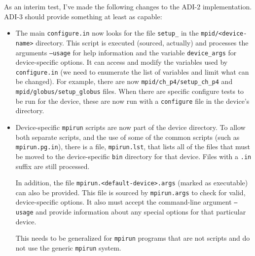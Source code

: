 \documentclass{article}
\let\file=\texttt
\let\code=\texttt
\begin{document}
As an interim test, I've made the following changes to the ADI-2
implementation.  ADI-3 should provide something at least as capable:
\begin{itemize}
\item The main \file{configure.in} now looks for the file
  \file{setup\_<device-name>} in the \file{mpid/<device-name>} directory.
  This script is executed (sourced, actually) and processes the arguments
  \texttt{--usage} for   help information and the variable
  \texttt{device\_args} for device-specific options.  It can access and modify
  the variables used by \file{configure.in} (we need to enumerate the list of
  variables and limit what can be changed).  For example, there are now
  \file{mpid/ch\_p4/setup\_ch\_p4} and \file{mpid/globus/setup\_globus} files.
  When there are specific configure tests to be run for the device, these are
  now run with a \file{configure} file in the device's directory.

\item Device-specific \file{mpirun} scripts are now part of the device
  directory.  To allow both separate scripts, and the use of some of the
  common scripts (such as \file{mpirun.pg.in}), there is a file,
  \file{mpirun.lst}, that lists all of the files that must be moved to the
  device-specific \file{bin} directory for that device.  Files with a
  \file{.in} suffix are still processed.

  In addition, the file \file{mpirun.<default-device>.args} (marked as 
  executable) can also be provided.  This file is sourced by
  \file{mpirun.args} to check for valid, device-specific options.  It also
  must accept the command-line argument \texttt{--usage} and provide 
  information about any special options for that particular device.

  This needs to be generalized for \code{mpirun} programs that are not scripts
  and do not use the generic \code{mpirun} system.
\end{itemize}
\end{document}
